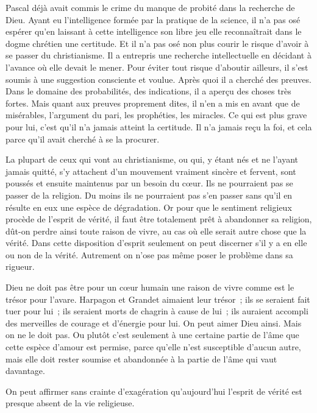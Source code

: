 \documentclass[french,twoside]{book} %
\begin{document}
Pascal déjà avait commis le crime du manque de probité dans la recherche de Dieu. Ayant eu l'intelligence formée par la pratique de la science, il n'a pas osé espérer qu'en laissant à cette intelligence son libre jeu elle reconnaîtrait dans le dogme chrétien une certitude. Et il n'a pas osé non plus courir le risque d'avoir à se passer du christianisme. Il a entrepris une recherche intellectuelle en décidant à l'avance où elle devait le mener. Pour éviter tout risque d'aboutir ailleurs, il s'est soumis à une suggestion consciente et voulue. Après quoi il a cherché des preuves. Dans le domaine des probabilités, des indications, il a aperçu des choses très fortes. Mais quant aux preuves proprement dites, il n'en a mis en avant que de misérables, l'argument du pari, les prophéties, les miracles. Ce qui est plus grave pour lui, c'est qu'il n'a jamais atteint la certitude. Il n'a jamais reçu la foi, et cela parce qu'il avait cherché à se la procurer.\par
La plupart de ceux qui vont au christianisme, ou qui, y étant nés et ne l'ayant jamais quitté, s'y attachent d'un mouvement vraiment sincère et fervent, sont poussés et ensuite maintenus par un besoin du cœur. Ils ne pourraient pas se passer de la religion. Du moins ils ne pourraient pas s'en passer sans qu'il en résulte en eux une espèce de dégradation. Or pour que le sentiment religieux procède de l'esprit de vérité, il faut être totalement prêt à abandonner sa religion, dût-on perdre ainsi toute raison de vivre, au cas où elle serait autre chose que la vérité. Dans cette disposition d'esprit seulement on peut discerner s'il y a en elle ou non de la vérité. Autrement on n'ose pas même poser le problème dans sa rigueur.\par
Dieu ne doit pas être pour un cœur humain une raison de vivre comme est le trésor pour l'avare. Harpagon et Grandet aimaient leur trésor ; ils se seraient fait tuer pour lui ; ils seraient morts de chagrin à cause de lui ; ils auraient accompli des merveilles de courage et d'énergie pour lui. On peut aimer Dieu ainsi. Mais on ne le doit pas. Ou plutôt c'est seulement à une certaine partie de l'âme que cette espèce d'amour est permise, parce qu'elle n'est susceptible d'aucun autre, mais elle doit rester soumise et abandonnée à la partie de l'âme qui vaut davantage.\par
On peut affirmer sans crainte d'exagération qu'aujourd'hui l'esprit de vérité est presque absent de la vie religieuse.\par
\end{document}

